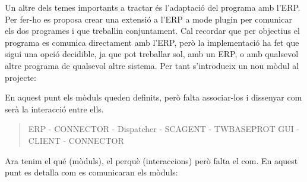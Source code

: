 \documentclass[letterpaper,11pt,catalan]{sphinxmanual}
\begin{document}
\begin{itemize}
\begin{quote}


\end{quote}

\end{itemize}

Un altre dels temes importants a tractar és l'adaptació del programa amb l'ERP. Per fer-ho es
proposa crear una extensió a l'ERP a mode plugin per comunicar els dos programes i que treballin
conjuntament. Cal recordar que per objectius el programa es comunica directament amb l'ERP, però
la implementació ha fet que sigui una opció decidible, ja que pot treballar sol, amb un ERP, o
amb qualsevol altre programa de qualsevol altre sistema. Per tant s'introdueix un nou mòdul al
projecte:
\begin{quote}

\end{quote}

En aquest punt els mòduls queden definits, però falta associar-los i dissenyar com
serà la interacció entre ells.
\begin{quote}

ERP - CONNECTOR - Dispatcher - SCAGENT - TWBASEPROT
GUI - CLIENT - CONNECTOR
\end{quote}

Ara tenim el qué (mòduls), el perquè (interaccions) però falta el com. En aquest punt
es detalla com es comunicaran els mòduls:
\end{document}
